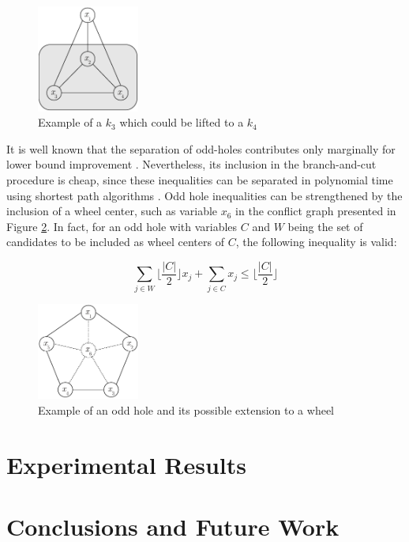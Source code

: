 \documentclass{endm}
\begin{document}
\begin{figure}
\begin{center}
	\includegraphics[width=0.3\textwidth]{clique.pdf}
	\caption{Example of a $k_{3}$ which could be lifted to a $k_{4}$ } \label{figClique}
\end{center}
\end{figure}

It is well known that the separation of odd-holes contributes only marginally for lower bound improvement \cite{Borndorfer1998,Mendez-Diaz2008}. Nevertheless, its inclusion in the branch-and-cut procedure is cheap, since these inequalities can be separated in polynomial time using shortest path algorithms \cite{Grotschel1993}. Odd hole inequalities can be strengthened by the inclusion of a wheel center, such as variable $x_{6}$ in the conflict graph presented in Figure \ref{figOH}. In fact, for an odd hole with variables $C$ and $W$ being the set of candidates to be included as wheel centers of $C$, the following inequality is valid:

\begin{equation}
	\sum_{j \in W} \lfloor \frac{|C|}{2} \rfloor x_{j} + \sum_{j \in C} x_{j} \leq \lfloor \frac{|C|}{2} \rfloor
\end{equation}

\begin{figure}
\begin{center}
	\includegraphics[width=0.3\textwidth]{oddHole.pdf}
	\caption{Example of an odd hole and its possible extension to a wheel} \label{figOH}
\end{center}
\end{figure}


\section{Experimental Results}\label{experiments}
\section{Conclusions and Future Work}\label{conclusions}



\end{document}
